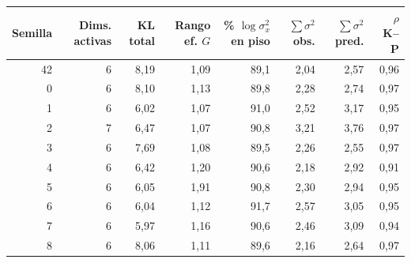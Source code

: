 \begin{tabular}{@{}rrrrrrrr@{}}
\toprule
Semilla & Dims. activas & KL total & Rango ef. $G$ & \% $\log\sigma_x^2$ en piso & $\sum\sigma^2$ obs. & $\sum\sigma^2$ pred. & $\rho$ K--P \\
\midrule
42 & 6 & 8{,}19 & 1{,}09 & 89{,}1 & 2{,}04 & 2{,}57 & 0{,}96 \\
0 & 6 & 8{,}10 & 1{,}13 & 89{,}8 & 2{,}28 & 2{,}74 & 0{,}97 \\
1 & 6 & 6{,}02 & 1{,}07 & 91{,}0 & 2{,}52 & 3{,}17 & 0{,}95 \\
2 & 7 & 6{,}47 & 1{,}07 & 90{,}8 & 3{,}21 & 3{,}76 & 0{,}97 \\
3 & 6 & 7{,}69 & 1{,}08 & 89{,}5 & 2{,}26 & 2{,}55 & 0{,}97 \\
4 & 6 & 6{,}42 & 1{,}20 & 90{,}6 & 2{,}18 & 2{,}92 & 0{,}91 \\
5 & 6 & 6{,}05 & 1{,}91 & 90{,}8 & 2{,}30 & 2{,}94 & 0{,}95 \\
6 & 6 & 6{,}04 & 1{,}12 & 91{,}7 & 2{,}57 & 3{,}05 & 0{,}95 \\
7 & 6 & 5{,}97 & 1{,}16 & 90{,}6 & 2{,}46 & 3{,}09 & 0{,}94 \\
8 & 6 & 8{,}06 & 1{,}11 & 89{,}6 & 2{,}16 & 2{,}64 & 0{,}97 \\
\bottomrule
\end{tabular}
